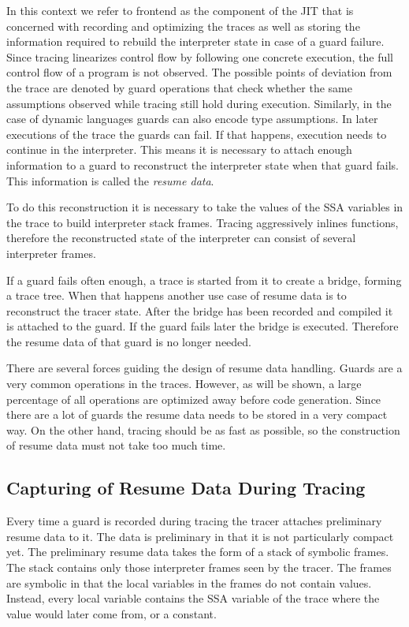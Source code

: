 \documentclass[10pt,preprint]{sigplanconf}
\begin{document}
In this context we refer to frontend as the component of the JIT that is
concerned with recording and optimizing the traces as well as storing the
information required to rebuild the interpreter state in case of a guard
failure.
Since tracing linearizes control flow by following one concrete execution,
the full control flow of a program is not observed.
The possible points of deviation from the trace are denoted by guard operations
that check whether the same assumptions observed while tracing
still hold during execution.
Similarly, in the case of dynamic languages guards can also encode type
assumptions.
In later executions of the trace the guards can fail.
If that happens, execution needs to continue in the interpreter.
This means it is necessary to attach enough information to a guard
to reconstruct the interpreter state when that guard fails.
This information is called the \emph{resume data}.

To do this reconstruction it is necessary to take the values of the SSA
variables in the trace to build interpreter stack frames.  Tracing
aggressively inlines functions, therefore the reconstructed state of the
interpreter can consist of several interpreter frames.

If a guard fails often enough, a trace is started from it
to create a bridge, forming a trace tree.
When that happens another use case of resume data
is to reconstruct the tracer state.
After the bridge has been recorded and compiled it is attached to the guard.
If the guard fails later the bridge is executed. Therefore the resume data of
that guard is no longer needed.

There are several forces guiding the design of resume data handling.
Guards are a very common operations in the traces.
However, as will be shown, a large percentage of all operations
are optimized away before code generation.
Since there are a lot of guards
the resume data needs to be stored in a very compact way.
On the other hand, tracing should be as fast as possible,
so the construction of resume data must not take too much time.

\subsection{Capturing of Resume Data During Tracing}
\label{sub:capturing}

Every time a guard is recorded during tracing
the tracer attaches preliminary resume data to it.
The data is preliminary in that it is not particularly compact yet.
The preliminary resume data takes the form of a stack of symbolic frames.
The stack contains only those interpreter frames seen by the tracer.
The frames are symbolic in that the local variables in the frames
do not contain values.
Instead, every local variable contains the SSA variable of the trace
where the value would later come from, or a constant.
\end{document}
